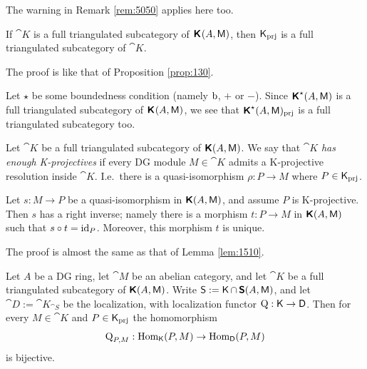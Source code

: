 The warning in Remark  \ref{rem:5050} applies here too. 

\begin{prop}  \label{prop:1521}
If  $\cat{K}$ is a full triangulated subcategory of $\boldsymbol{\mathsf{K}}^{}(A, 
\operatorname{\mathsf{M}})$, then $\operatorname{\mathsf{K}}_{\mathrm{prj}}$ is a full triangulated subcategory of 
$\cat{K}$.
\end{prop}

The proof is like that of Proposition \ref{prop:130}.

\begin{exa} \label{exa:1521}
Let $\star$ be some boundedness condition (namely $\mathrm{b}$, $+$ or $-$). 
Since $\boldsymbol{\mathsf{K}}^{\star}(A, \operatorname{\mathsf{M}})$ 
is a full triangulated subcategory of $\boldsymbol{\mathsf{K}}^{}(A, \operatorname{\mathsf{M}})$,
we see that $\boldsymbol{\mathsf{K}}^{\star}(A, \operatorname{\mathsf{M}})_{\mathrm{prj}}$
is a full triangulated subcategory too.  
\end{exa}

\begin{dfn} \label{dfn:1523}
Let $\cat{K}$ be a full triangulated subcategory of 
$\boldsymbol{\mathsf{K}}(A, \operatorname{\mathsf{M}})$. We say that $\cat{K}$ 
{\em has enough K-projectives}%
if every DG module $M \in \cat{K}$ admits a K-projective resolution inside 
$\cat{K}$. I.e.\ there is a quasi-isomorphism $\rho : P \to M$
where $P \in \operatorname{\mathsf{K}}_{\mathrm{prj}}$.
\end{dfn}

\begin{lem} \label{lem:1521}
Let  $s : M \to P$ be a quasi-isomorphism in 
$\boldsymbol{\mathsf{K}}(A, \operatorname{\mathsf{M}})$, and assume $P$ is K-projective. Then $s$ has 
a right inverse; namely there is a morphism $t : P \to M$ in
$\boldsymbol{\mathsf{K}}(A, \operatorname{\mathsf{M}})$ such that $s \circ t = \operatorname{id}_P$.
Moreover, this morphism $t$ is unique.  
\end{lem}

The proof is almost the same as that of Lemma \ref{lem:1510}.

\begin{thm} \label{thm:3145}
Let $A$ be a DG ring, let $\cat{M}$ be an abelian category, and let
$\cat{K}$ be a full triangulated subcategory of $\boldsymbol{\mathsf{K}}(A, \operatorname{\mathsf{M}})$.
Write $\operatorname{\mathsf{S}} := \operatorname{\mathsf{K}} \cap \, \boldsymbol{\mathsf{S}}(A, \operatorname{\mathsf{M}})$,
and let $\cat{D} := \cat{K}_{\cat{S}}$ be the localization, with localization 
functor $\operatorname{Q} : \operatorname{\mathsf{K}} \to \operatorname{\mathsf{D}}$. 
Then for every $M \in \cat{K}$ and $P \in \operatorname{\mathsf{K}}_{\mathrm{prj}}$
the homomorphism  
\[ \operatorname{Q}_{P, M} : \operatorname{Hom}_{\operatorname{\mathsf{K}}}(P, M) \to \operatorname{Hom}_{\operatorname{\mathsf{D}}}(P, M) 
\]
is bijective.  
\end{thm}


